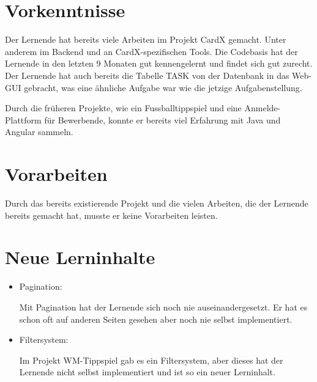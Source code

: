 \section{Vorkenntnisse}\label{sec:vorkenntnisse}
Der Lernende hat bereits viele Arbeiten im Projekt CardX gemacht. Unter anderem im Backend und an CardX-spezifischen Tools. Die Codebasis hat der Lernende in den letzten 9 Monaten gut kennengelernt und findet sich gut zurecht. Der Lernende hat auch bereits die Tabelle TASK von der Datenbank in das Web-GUI gebracht, was eine ähnliche Aufgabe war wie die jetzige Aufgabenstellung.

Durch die früheren Projekte, wie ein Fussballtippspiel und eine Anmelde-Plattform für Bewerbende, konnte er bereits viel Erfahrung mit Java und Angular sammeln.

\section{Vorarbeiten}\label{sec:vorarbeiten}
Durch das bereits existierende Projekt und die vielen Arbeiten, die der Lernende bereits gemacht hat, musste er keine Vorarbeiten leisten.

\section{Neue Lerninhalte}\label{sec:neue-lerninhalte}
\begin{itemize}
    \item Pagination: 
    
    Mit Pagination hat der Lernende sich noch nie auseinandergesetzt. Er hat es schon oft auf anderen Seiten gesehen aber noch nie selbst implementiert.
    \item Filtersystem:
    
    Im Projekt WM-Tippspiel gab es ein Filtersystem, aber dieses hat der Lernende nicht selbst implementiert und ist so ein neuer Lerninhalt.
\end{itemize}

